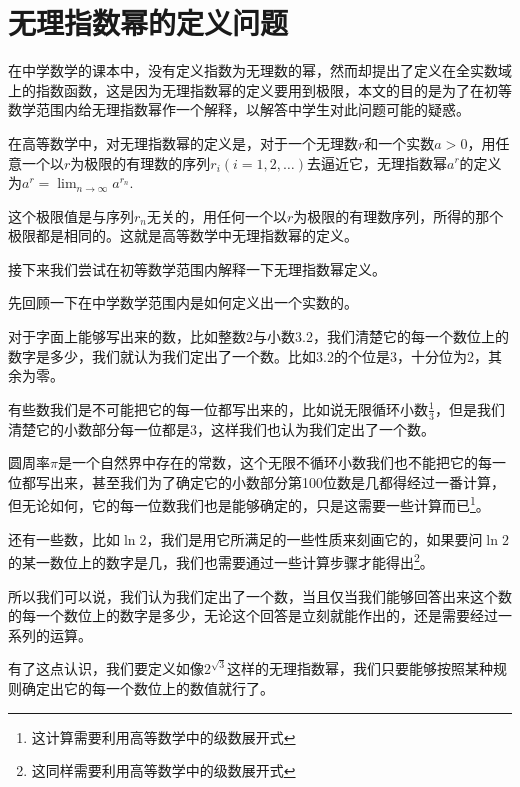 
\section{无理指数幂的定义问题}
\label{sec:irrational-power}

在中学数学的课本中，没有定义指数为无理数的幂，然而却提出了定义在全实数域上的指数函数，这是因为无理指数幂的定义要用到极限，本文的目的是为了在初等数学范围内给无理指数幂作一个解释，以解答中学生对此问题可能的疑惑。

在高等数学中，对无理指数幂的定义是，对于一个无理数$r$和一个实数$a>0$，用任意一个以$r$为极限的有理数的序列$r_i(i=1,2,\ldots)$去逼近它，无理指数幂$a^r$的定义为$a^r=\lim_{n \to \infty}a^{r_n}$.

这个极限值是与序列$r_n$无关的，用任何一个以$r$为极限的有理数序列，所得的那个极限都是相同的。这就是高等数学中无理指数幂的定义。

接下来我们尝试在初等数学范围内解释一下无理指数幂定义。

先回顾一下在中学数学范围内是如何定义出一个实数的。

对于字面上能够写出来的数，比如整数2与小数3.2，我们清楚它的每一个数位上的数字是多少，我们就认为我们定出了一个数。比如3.2的个位是3，十分位为2，其余为零。

有些数我们是不可能把它的每一位都写出来的，比如说无限循环小数$\frac{1}{3}$，但是我们清楚它的小数部分每一位都是3，这样我们也认为我们定出了一个数。

圆周率$\pi$是一个自然界中存在的常数，这个无限不循环小数我们也不能把它的每一位都写出来，甚至我们为了确定它的小数部分第100位数是几都得经过一番计算，但无论如何，它的每一位数我们也是能够确定的，只是这需要一些计算而已\footnote{这计算需要利用高等数学中的级数展开式}。

还有一些数，比如$\ln{2}$，我们是用它所满足的一些性质来刻画它的，如果要问$\ln{2}$的某一数位上的数字是几，我们也需要通过一些计算步骤才能得出\footnote{这同样需要利用高等数学中的级数展开式}。

所以我们可以说，我们认为我们定出了一个数，当且仅当我们能够回答出来这个数的每一个数位上的数字是多少，无论这个回答是立刻就能作出的，还是需要经过一系列的运算。

有了这点认识，我们要定义如像$2^{\sqrt{3}}$这样的无理指数幂，我们只要能够按照某种规则确定出它的每一个数位上的数值就行了。



